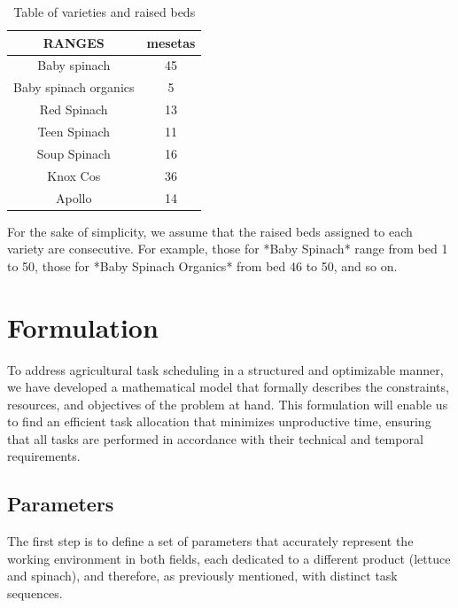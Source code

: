  \begin{table}[ht!]
    \centering
    \begin{minipage}{0.48\textwidth}
        \centering
        \begin{tabular}{|c|c|}
            \hline
            \rowcolor{gray!30} \textbf{\textcolor{grey3}{RANGES}} & \textbf{\textcolor{grey3}{mesetas}}\\\hline
            \hline
            Baby spinach   & 45 \\ \hline
            Baby spinach organics   & 5\\ \hline
            Red Spinach             & 13\\ \hline
            Teen Spinach            & 11\\ \hline
            Soup Spinach & 16 \\ \hline
            Knox Cos     & 36 \\ \hline
            Apollo      & 14 \\             
            \hline
        \end{tabular}
        \caption{Table of varieties and raised beds}
        \label{tab:Variedades}
    \end{minipage}
    \hfill
\end{table}
For the sake of simplicity, we assume that the raised beds assigned to each variety are consecutive.  
For example, those for *Baby Spinach* range from bed 1 to 50, those for *Baby Spinach Organics* from bed 46 to 50, and so on.


\chapter*{Formulation}

To address agricultural task scheduling in a structured and optimizable manner, we have developed a mathematical model that formally describes the constraints, resources, and objectives of the problem at hand.  
This formulation will enable us to find an efficient task allocation that minimizes unproductive time, ensuring that all tasks are performed in accordance with their technical and temporal requirements.

\section*{Parameters}
The first step is to define a set of parameters that accurately represent the working environment in both fields, each dedicated to a different product (lettuce and spinach),  
and therefore, as previously mentioned, with distinct task sequences.


